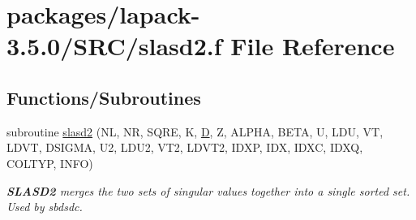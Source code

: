 \hypertarget{slasd2_8f}{}\section{packages/lapack-\/3.5.0/\+S\+R\+C/slasd2.f File Reference}
\label{slasd2_8f}
\subsection*{Functions/\+Subroutines}
\begin{DoxyCompactItemize}
\item 
subroutine \hyperlink{group__auxOTHERauxiliary_ga33ea099005fc608ad8a5b79662e02b84}{slasd2} (N\+L, N\+R, S\+Q\+R\+E, K, \hyperlink{odrpack_8h_a7dae6ea403d00f3687f24a874e67d139}{D}, Z, A\+L\+P\+H\+A, B\+E\+T\+A, U, L\+D\+U, V\+T, L\+D\+V\+T, D\+S\+I\+G\+M\+A, U2, L\+D\+U2, V\+T2, L\+D\+V\+T2, I\+D\+X\+P, I\+D\+X, I\+D\+X\+C, I\+D\+X\+Q, C\+O\+L\+T\+Y\+P, I\+N\+F\+O)
\begin{DoxyCompactList}\small\item\em {\bfseries S\+L\+A\+S\+D2} merges the two sets of singular values together into a single sorted set. Used by sbdsdc. \end{DoxyCompactList}\end{DoxyCompactItemize}

